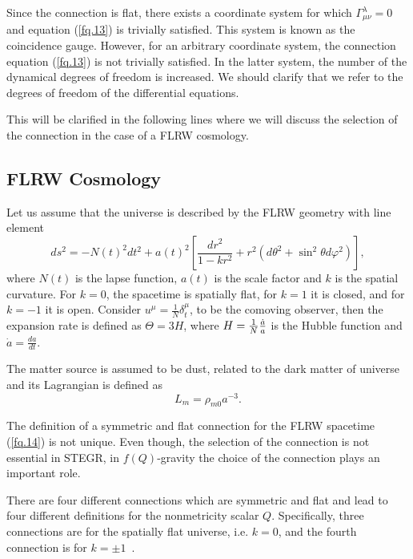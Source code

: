 \documentclass[onecolumn,superscriptaddress,secnumarabic,nobibnotes,aps,prd,nofootinbib,altaffilletter,11pt]{revtex4}
\begin{document}
Since the connection is flat, there exists a coordinate system for which $\Gamma _{\mu \nu }^{\lambda }=0$ and equation (\ref{fq.13}) is trivially satisfied. This system is known as the coincidence gauge. However, for an arbitrary coordinate system, the connection equation (\ref{fq.13}) is
not trivially satisfied. In the latter system, the number of the dynamical degrees of freedom is increased. We should clarify that we refer to the degrees of freedom of the differential equations. 

This will be clarified in the following lines where we will discuss the selection of the
connection in the case of a FLRW cosmology.

\subsection{FLRW Cosmology}

Let us assume that the universe is described by the FLRW geometry with line
element 
\begin{equation}
ds^{2}=-N(t)^{2}dt^{2}+a(t)^{2}\left[ \frac{dr^{2}}{1-kr^{2}}+r^{2}\left(
d\theta ^{2}+\sin ^{2}\theta d\varphi ^{2}\right) \right] ,  \label{fq.14}
\end{equation}%
where $N\left(t\right) $ is the lapse function, $a\left( t\right) $ is the
scale factor and $k$ is the spatial curvature. For $k=0$, the spacetime is spatially flat, for $k=1$ it is closed, and for $k=-1$ it is open. Consider $%
u^{\mu }=\frac{1}{N}\delta _{t}^{\mu }$, to be the comoving observer, then
the expansion rate is defined as $\Theta =3H$, where $H=\frac{1}{N}\frac{%
\dot{a}}{a}$ is the Hubble function and $\dot{a}=\frac{da}{dt}$.

The matter source is assumed to be dust, related to the dark matter of universe and its Lagrangian is defined as 
\begin{equation}
L_{m}=\rho _{m0}a^{-3}.
\end{equation}

The definition of a symmetric and flat connection for the FLRW spacetime (\ref{fq.14}) is not unique. Even though, the selection of the connection is not essential in STEGR, in $f\left( Q\right) $-gravity the choice of the connection plays an important role.

There are four different connections which are symmetric and flat and lead
to four different definitions for the nonmetricity scalar $Q$. Specifically,
three connections are for the spatially flat universe, i.e. $k=0$, and the
fourth connection is for $k=\pm 1$~\cite{he1,he2,he3}.
\end{document}
